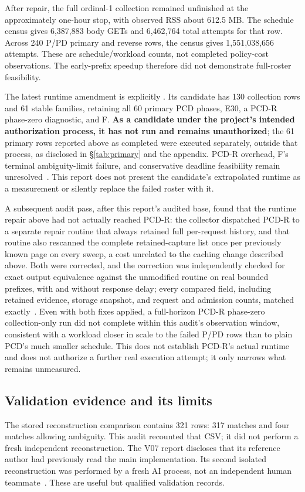 \documentclass[11pt]{article}
\newcommand{\repo}[1]{{\small\path{#1}}}
\begin{document}
After repair, the full ordinal-1 collection remained unfinished at the approximately one-hour stop, with observed RSS about 612.5 MB. The schedule census gives 6,387,883 body GETs and 6,462,764 total attempts for that row. Across 240 P/PD primary and reverse rows, the census gives 1,551,038,656 attempts. These are schedule/workload counts, not completed policy-cost observations. The early-prefix speedup therefore did not demonstrate full-roster feasibility.

The latest runtime amendment is explicitly \repo{BLOCKED_NOT_FROZEN}. Its candidate has 130 collection rows and 61 stable families, retaining all 60 primary PCD phases, E30, a PCD-R phase-zero diagnostic, and F. \textbf{As a candidate under the project's intended authorization process, it has not run and remains unauthorized}; the 61 primary rows reported above as completed were executed separately, outside that process, as disclosed in \S\ref{tab:primary} and the appendix. PCD-R overhead, F's terminal ambiguity-limit failure, and conservative deadline feasibility remain unresolved~\cite{runtime}. This report does not present the candidate's extrapolated runtime as a measurement or silently replace the failed roster with it.

A subsequent audit pass, after this report's audited base, found that the runtime repair above had not actually reached PCD-R: the collector dispatched PCD-R to a separate repair routine that always retained full per-request history, and that routine also rescanned the complete retained-capture list once per previously known page on every sweep, a cost unrelated to the caching change described above. Both were corrected, and the correction was independently checked for exact output equivalence against the unmodified routine on real bounded prefixes, with and without response delay; every compared field, including retained evidence, storage snapshot, and request and admission counts, matched exactly~\cite{validation}. Even with both fixes applied, a full-horizon PCD-R phase-zero collection-only run did not complete within this audit's observation window, consistent with a workload closer in scale to the failed P/PD rows than to plain PCD's much smaller schedule. This does not establish PCD-R's actual runtime and does not authorize a further real execution attempt; it only narrows what remains unmeasured.

\subsection{Validation evidence and its limits}
The stored reconstruction comparison contains 321 rows: 317 matches and four matches allowing ambiguity. This audit recounted that CSV; it did not perform a fresh independent reconstruction. The V07 report discloses that its reference author had previously read the main implementation. Its second isolated reconstruction was performed by a fresh AI process, not an independent human teammate~\cite{validation}. These are useful but qualified validation records.
\end{document}
